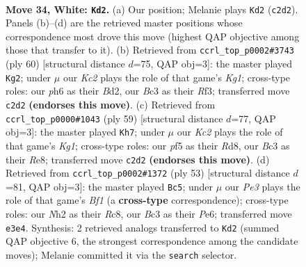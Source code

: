 \documentclass[11pt]{article}
\begin{document}
\clearpage

\begin{figure}[p]\centering
\begin{subfigure}{0.46\textwidth}\centering
\resizebox{\linewidth}{!}{%
\newchessgame
\chessboard[
  setfen={1k3b2/rp4pr/p1p1b2p/P4p2/2pP3P/2B1P3/1PK2PPN/R6R w - - 2 34},
  showmover=false,
  pgfstyle=straightmove, color=movearrow, markmove={c2-d2}
]}
\caption{}
\end{subfigure}\hfill
\begin{subfigure}{0.46\textwidth}\centering
\resizebox{\linewidth}{!}{%
\newchessgame
\chessboard[
  setfen={4b3/2k4r/p2pr1pp/1p2p3/nP2P1PN/5R1P/2PB1P2/4R1K1 w - - 1 31},
  showmover=false,
  pgfstyle=straightmove, color=movearrow, markmove={g1-g2}
]}
\caption{}
\end{subfigure}
\\[4pt]
\begin{subfigure}{0.46\textwidth}\centering
\resizebox{\linewidth}{!}{%
\newchessgame
\chessboard[
  setfen={3rrbk1/p4p2/1p1ppP1p/7p/P1PBP3/1P6/6PP/4RRK1 b - - 1 30},
  showmover=false,
  pgfstyle=straightmove, color=movearrow, markmove={g8-h7}
]}
\caption{}
\end{subfigure}\hfill
\begin{subfigure}{0.46\textwidth}\centering
\resizebox{\linewidth}{!}{%
\newchessgame
\chessboard[
  setfen={r1r2b2/1p3pk1/p3p1pp/4P3/4RPP1/4B2P/PP3R2/6K1 b - - 0 27},
  showmover=false,
  pgfstyle=straightmove, color=movearrow, markmove={f8-c5}
]}
\caption{}
\end{subfigure}
\caption{\textbf{Move 34, White: \texttt{Kd2}.} (a) Our position; Melanie plays \texttt{Kd2} (\texttt{c2d2}). Panels (b)--(d) are the retrieved master positions whose correspondence most drove this move (highest QAP objective among those that transfer to it). (b) Retrieved from \texttt{ccrl\_top\_p0002\#3743} (ply 60) [structural distance $d$=75, QAP obj=3]: the master played \texttt{Kg2}; under $\mu$ our \emph{Kc2} plays the role of that game's \emph{Kg1}; cross-type roles: our \emph{p}h6 as their \emph{B}d2, our \emph{B}c3 as their \emph{R}f3; transferred move \texttt{c2d2} \textbf{(endorses this move)}. (c) Retrieved from \texttt{ccrl\_top\_p0000\#1043} (ply 59) [structural distance $d$=77, QAP obj=3]: the master played \texttt{Kh7}; under $\mu$ our \emph{Kc2} plays the role of that game's \emph{Kg1}; cross-type roles: our \emph{p}f5 as their \emph{R}d8, our \emph{B}c3 as their \emph{R}e8; transferred move \texttt{c2d2} \textbf{(endorses this move)}. (d) Retrieved from \texttt{ccrl\_top\_p0002\#1372} (ply 53) [structural distance $d$=81, QAP obj=3]: the master played \texttt{Bc5}; under $\mu$ our \emph{Pe3} plays the role of that game's \emph{Bf1} (a \textbf{cross-type} correspondence); cross-type roles: our \emph{N}h2 as their \emph{R}c8, our \emph{B}c3 as their \emph{P}e6; transferred move \texttt{e3e4}. Synthesis: 2 retrieved analogs transferred to \texttt{Kd2} (summed QAP objective 6, the strongest correspondence among the candidate moves); Melanie committed it via the \texttt{search} selector.}
\label{fig:thought-m66}
\end{figure}
\end{document}
